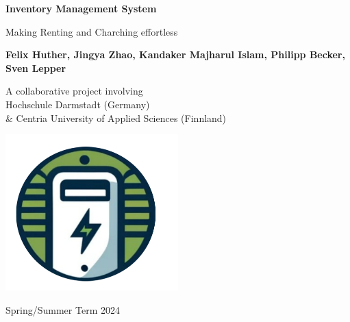 \begin{titlepage}
    \begin{center}
            
        \Huge
        \textbf{Inventory Management System}
            
        \vspace{0.3cm}
        \Large
        Making Renting and Charching effortless
            
        \vspace{1.0cm}
            
        \textbf{
        Felix Huther,
        Jingya Zhao,
        Kandaker Majharul Islam,
        Philipp Becker,
        Sven Lepper }
          
        \vfill            
        A collaborative project involving\\
        Hochschule Darmstadt (Germany) \\\& Centria University of Applied Sciences (Finnland)

        \vspace{0.5cm}
            
        \includegraphics[width=0.5\textwidth]{images/logo.png}

            
        \Large
      
        Spring/Summer Term 2024
            
    \end{center}
\end{titlepage}

